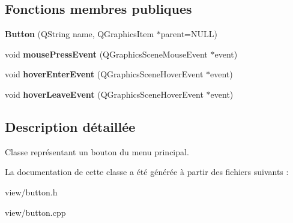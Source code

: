 \subsection*{Fonctions membres publiques}
\begin{DoxyCompactItemize}
\item 
\hypertarget{classButton_a69976e5c00874a3807b642f249c1c776}{{\bfseries Button} (Q\+String name, Q\+Graphics\+Item $\ast$parent=N\+U\+L\+L)}\label{classButton_a69976e5c00874a3807b642f249c1c776}

\item 
\hypertarget{classButton_a17d8eb0c904605b223bbc00c75655315}{void {\bfseries mouse\+Press\+Event} (Q\+Graphics\+Scene\+Mouse\+Event $\ast$event)}\label{classButton_a17d8eb0c904605b223bbc00c75655315}

\item 
\hypertarget{classButton_a633a9684818bc5d300a622a00064f09c}{void {\bfseries hover\+Enter\+Event} (Q\+Graphics\+Scene\+Hover\+Event $\ast$event)}\label{classButton_a633a9684818bc5d300a622a00064f09c}

\item 
\hypertarget{classButton_a1689a97690d9469ce8350d24db0d7485}{void {\bfseries hover\+Leave\+Event} (Q\+Graphics\+Scene\+Hover\+Event $\ast$event)}\label{classButton_a1689a97690d9469ce8350d24db0d7485}

\end{DoxyCompactItemize}


\subsection{Description détaillée}
Classe représentant un bouton du menu principal. 

La documentation de cette classe a été générée à partir des fichiers suivants \+:\begin{DoxyCompactItemize}
\item 
view/button.\+h\item 
view/button.\+cpp\end{DoxyCompactItemize}
